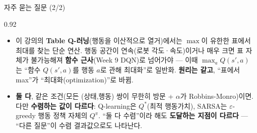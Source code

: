 \begin{frame}{자주 묻는 질문 (2/2)}
\begin{center}\begin{varwidth}{0.92\textwidth}
  \begin{itemize}
    \item {}
      이 강의의 \textbf{Table Q-러닝}(행동을 이산적으로 열거)에서는
      $\max$이 유한한 표에서 최대를 찾는 단순 연산.
      행동 공간이 연속(로봇 각도·속도)이거나 매우 크면 표 자체가
      불가능해져 \textbf{함수 근사}(Week 9 DQN)로 넘어가야 ---
      이때 $\max_a Q(s',a)$는 ``함수 $Q(s',a)$를 행동 $a$로 관해
      최대화''로 일반화. \textbf{원리는 같고}, ``표에서 max''가
      ``최대화(optimization)''로 바뀜.
    \item {}
      \textbf{둘 다}, 같은 조건(모든 (상태,행동) 쌍이 무한히 방문 +
      $\alpha$가 Robbins-Monro)이면. 다만 \textbf{수렴하는 값이
      다르다}: Q-learning은 $Q^{*}$(최적 행동가치), SARSA는
      $\varepsilon$-greedy 행동 정책 자체의 $Q^{\pi}$.
      ``둘 다 수렴''이라 해도 \textbf{도달하는 지점이 다르다} ---
      ``다른 질문''이 수렴 결과값으로도 나타난다.
  \end{itemize}
\end{varwidth}\end{center}
\end{frame}
